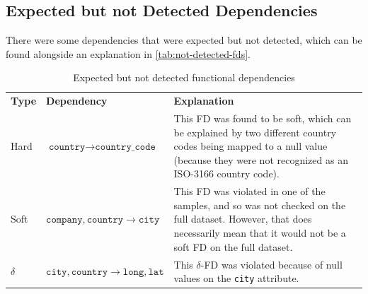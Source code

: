 \documentclass{article}
\begin{document}
    \subsection{Expected but not Detected Dependencies}
    
    There were some dependencies that were  expected but not detected, which can be found alongside an explanation in \autoref{tab:not-detected-fds}.
    
        \begin{table}[!h]
            \centering
            \begin{tabular}{|p{}|p{}|p{}|}
                \hline
                \textbf{Type} & \textbf{Dependency} & \textbf{Explanation} \\
                \Xhline{2\arrayrulewidth}
                Hard & $\texttt{country} \rightarrow \texttt{country\_code}$ & This FD was found to be soft, which can be explained by two different country codes being mapped to a null value (because they were not recognized as an ISO-3166 country code).\\
                \hline
                Soft & $\texttt{company}, \texttt{country} \rightarrow \texttt{city}$ & This FD was violated in one of the samples, and so was not checked on the full dataset. However, that does necessarily mean that it would not be a soft FD on the full dataset.\\
                \hline
                $\delta$ & $\texttt{city}, \texttt{country} \rightarrow \texttt{long}, \texttt{lat}$ & This $\delta$-FD was violated because of null values on the \texttt{city} attribute.\\      \hline
            \end{tabular}
            \caption{Expected but not detected functional dependencies}
            \label{tab:not-detected-fds}
        \end{table}
\end{document}
